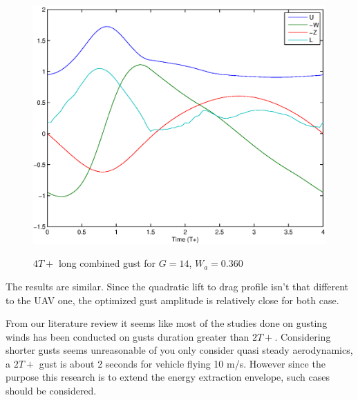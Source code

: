     \begin{figure}[ht]
      \begin{center}
	\scalebox{0.8}
	{\includegraphics{./Figures/Windtype=3_Tg=4_Wg=0p360_quad_G=13.eps}}
      \end{center}
      \caption{$4T+$ long combined gust for $G=14$, $W_a=0.360$}
      \label{fig:combined_optimization_UAV_modified}
    \end{figure}

    \par The results are similar.
    Since the quadratic lift to drag profile isn't that different to the UAV one, the optimized gust amplitude is relatively close for both case.

    \FloatBarrier

%



    From our literature review it seems like most of the studies done on gusting winds has been conducted on gusts duration greater than $2T+$.
    Considering shorter gusts seems unreasonable of you only consider quasi steady aerodynamics, a $2T+$ gust is about 2 seconds for vehicle flying 10 m/s.
    However since the purpose this research is to extend the energy extraction envelope, such cases should be considered.

